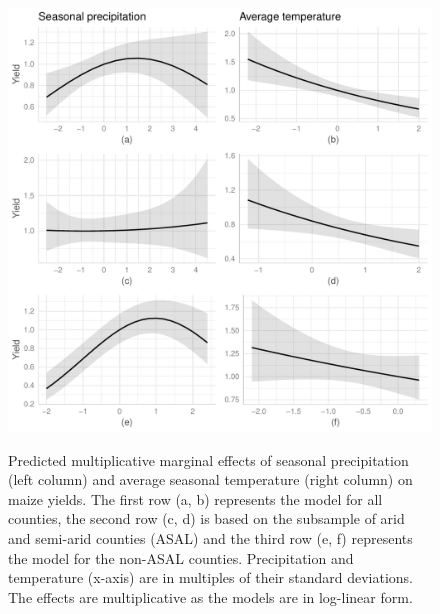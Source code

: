 \documentclass[12pt]{iopart}
\begin{document}
\begin{itemize}
  \begin{figure}
   \includegraphics{Figure1a_1f.pdf}\label{MarEff1}
\caption{Predicted multiplicative marginal effects of seasonal precipitation (left column) and average seasonal temperature (right column) on maize yields. The first row (a, b) represents the model for all counties, the second row (c, d) is based on the subsample of arid and semi-arid counties (ASAL) and the third row (e, f) represents the model for the non-ASAL counties. Precipitation and temperature (x-axis) are in multiples of their standard deviations. The effects are multiplicative as the models are in log-linear form.}
\end{figure}



\end{itemize}
\end{document}

